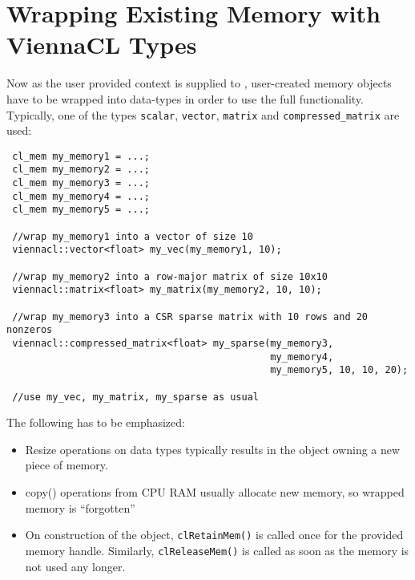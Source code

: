 \section{Wrapping Existing Memory with ViennaCL Types}
Now as the user provided context is supplied to {\ViennaCL}, user-created memory objects have to be wrapped into {\ViennaCL} data-types in order to use the full functionality.
Typically, one of the types \lstinline|scalar|, \lstinline|vector|, \lstinline|matrix| and \lstinline|compressed_matrix| are used:
\begin{lstlisting}
 cl_mem my_memory1 = ...;
 cl_mem my_memory2 = ...;
 cl_mem my_memory3 = ...;
 cl_mem my_memory4 = ...;
 cl_mem my_memory5 = ...;

 //wrap my_memory1 into a vector of size 10
 viennacl::vector<float> my_vec(my_memory1, 10);

 //wrap my_memory2 into a row-major matrix of size 10x10
 viennacl::matrix<float> my_matrix(my_memory2, 10, 10);

 //wrap my_memory3 into a CSR sparse matrix with 10 rows and 20 nonzeros
 viennacl::compressed_matrix<float> my_sparse(my_memory3,
                                              my_memory4,
                                              my_memory5, 10, 10, 20);

 //use my_vec, my_matrix, my_sparse as usual
\end{lstlisting}
The following has to be emphasized:
\begin{itemize}
 \item Resize operations on {\ViennaCL} data types typically results in the object owning a new piece of memory.
 \item copy() operations from CPU RAM usually allocate new memory, so wrapped memory is ``forgotten''
 \item On construction of the {\ViennaCL} object, \lstinline|clRetainMem()| is called once for the provided memory handle. Similarly, \lstinline|clReleaseMem()| is called as soon as the memory is not used any longer.
\end{itemize}


